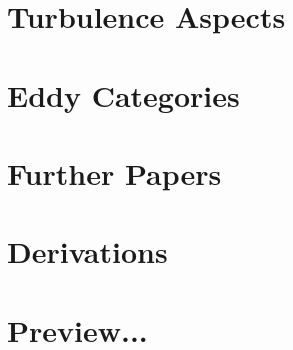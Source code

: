  \appendix
 \begin{appendices}
  \setcounter{secnumdepth}{1}
  \pagestyle{fancy}
  \chapter{Turbulence Aspects}
  
  \chapter{Eddy Categories}
  
 \chapter{Further Papers}
  
 \chapter{Derivations}
 
 \chapter{Preview...}
  
 \end{appendices}
 \backmatter
  
  
  \listoftodos
 
 












